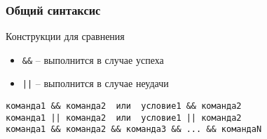 \begin{frame}[fragile]
    \frametitle{Общий синтаксис}

	\begin{block}{Конструкции для сравнения}
		\begin{itemize}
			\item {\tt \&\&} -- выполнится в случае успеха
			\item {\tt ||} -- выполнится в случае неудачи
		\end{itemize}
	\end{block}

	\begin{verbatim}
команда1 && команда2  или  условие1 && команда2 
команда1 || команда2  или  условие1 || команда2 
команда1 && команда2 && команда3 && ... && командаN
	\end{verbatim}

\end{frame}
